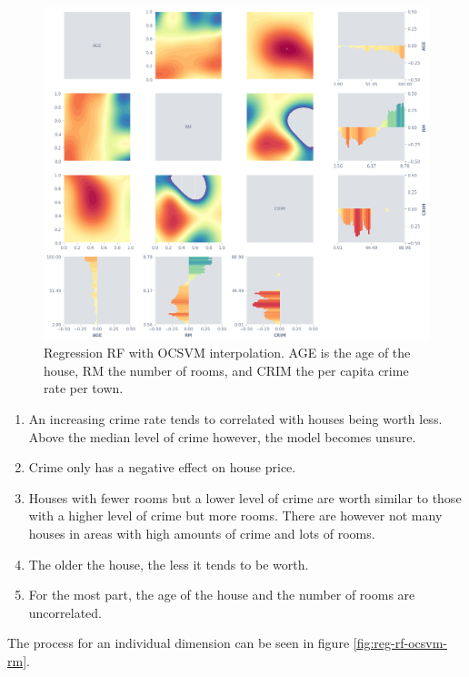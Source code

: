 \documentclass[a4paperpaper,twocolumn]{article}
\begin{document}
\begin{figure}
\centering
\includegraphics[width=\columnwidth]{img/reg_rf_ocsvm_matrix.png}
\caption{Regression RF with OCSVM interpolation. AGE is the age of the house, RM the number of rooms, and CRIM the per capita crime rate per town.}
\label{fig:reg-rf-ocsvm-matrix}
\end{figure}

\begin{enumerate}
\item An increasing crime rate tends to correlated with houses being worth less. Above the median level of crime however, the model becomes unsure.
\item Crime only has a negative effect on house price.
\item Houses with fewer rooms but a lower level of crime are worth similar to those with a higher level of crime but more rooms. There are however not many houses in areas with high amounts of crime and lots of rooms.
\item The older the house, the less it tends to be worth.
\item For the most part, the age of the house and the number of rooms are uncorrelated.
\end{enumerate}

The process for an individual dimension can be seen in figure \ref{fig:reg-rf-ocsvm-rm}.
\end{document}
